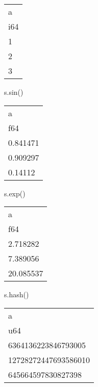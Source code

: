 \documentclass[
  letterpaper,
  DIV=11,
  numbers=noendperiod]{scrartcl}
\newenvironment{Shaded}{\begin{snugshade}}{\end{snugshade}}
\newcommand{\BuiltInTok}[1]{\textcolor[rgb]{0.00,0.23,0.31}{#1}}
\newcommand{\NormalTok}[1]{\textcolor[rgb]{0.00,0.23,0.31}{#1}}
\begin{document}
\begin{longtable}[]{@{}l@{}}
\toprule()
a \\
i64 \\
\midrule()
\endhead
1 \\
2 \\
3 \\
\bottomrule()
\end{longtable}

\begin{Shaded}
\begin{Highlighting}[]
\NormalTok{s.sin()}
\end{Highlighting}
\end{Shaded}

\begin{longtable}[]{@{}l@{}}
\toprule()
a \\
f64 \\
\midrule()
\endhead
0.841471 \\
0.909297 \\
0.14112 \\
\bottomrule()
\end{longtable}

\begin{Shaded}
\begin{Highlighting}[]
\NormalTok{s.exp()}
\end{Highlighting}
\end{Shaded}

\begin{longtable}[]{@{}l@{}}
\toprule()
a \\
f64 \\
\midrule()
\endhead
2.718282 \\
7.389056 \\
20.085537 \\
\bottomrule()
\end{longtable}

\begin{Shaded}
\begin{Highlighting}[]
\NormalTok{s.}\BuiltInTok{hash}\NormalTok{()}
\end{Highlighting}
\end{Shaded}

\begin{longtable}[]{@{}l@{}}
\toprule()
a \\
u64 \\
\midrule()
\endhead
6364136223846793005 \\
12728272447693586010 \\
645664597830827398 \\
\bottomrule()
\end{longtable}
\end{document}

